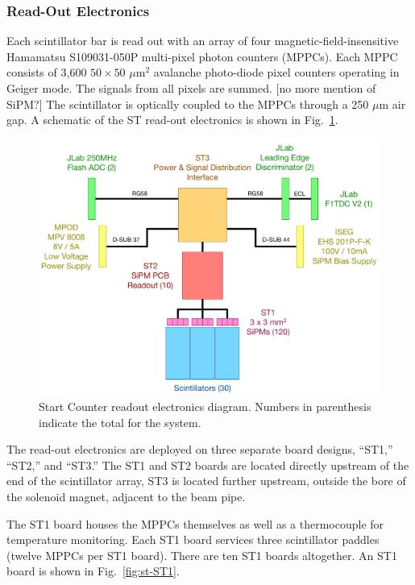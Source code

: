 \subsubsection{Read-Out Electronics}

Each scintillator bar is read out with an array of four
magnetic-field-insensitive Hamamatsu S109031-050P multi-pixel photon
counters (MPPCs). Each MPPC consists of 3,600
$50 \times 50$ $\mu$m$^2$ avalanche photo-diode pixel counters
operating in Geiger mode. The signals from all pixels are summed. [no
  more mention of SiPM?] The scintillator is optically coupled to the
MPPCs through a 250 $\mu$m air gap. A schematic of the ST read-out electronics is shown in Fig.~\ref{fig:st-electronics}.

\begin{figure}[!htb]
  \centering
  \includegraphics[width=1.0\columnwidth]{figures/st_electronics_diagram}
  \caption{Start Counter readout electronics diagram.  Numbers in 
    parenthesis indicate the total for the system.}
  \label{fig:st-electronics}
\end{figure}

The read-out electronics are deployed on three separate board designs,
``ST1,'' ``ST2,'' and ``ST3.'' The ST1 and ST2 boards are located
directly upstream of the end of the scintillator array, ST3 is located
further upstream, outside the bore of the solenoid magnet, adjacent to
the beam pipe.

The ST1 board houses the MPPCs themselves as well as a thermocouple for
temperature monitoring. Each ST1 board services three scintillator
paddles (twelve MPPCs per ST1 board). There are ten ST1 boards altogether. An ST1 board is shown in Fig.~\ref{fig:st-ST1}.

